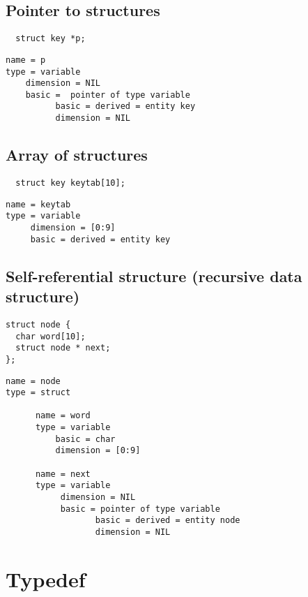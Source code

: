 \documentclass[a4paper]{report}
\begin{document}
\subsection{Pointer to structures}

\begin{lstlisting}
  struct key *p;
\end{lstlisting}

\begin{verbatim}
name = p
type = variable
    dimension = NIL
    basic =  pointer of type variable
          basic = derived = entity key
          dimension = NIL
\end{verbatim}

\subsection{Array of structures}

\begin{lstlisting}
  struct key keytab[10];
\end{lstlisting}

\begin{verbatim}
name = keytab
type = variable
     dimension = [0:9]
     basic = derived = entity key
\end{verbatim}

\subsection{Self-referential structure (recursive data structure)}

\begin{lstlisting}
struct node {
  char word[10];
  struct node * next;
};
\end{lstlisting}

\begin{verbatim}
name = node
type = struct 

      name = word
      type = variable
          basic = char
          dimension = [0:9] 

      name = next
      type = variable
           dimension = NIL
           basic = pointer of type variable
                  basic = derived = entity node
                  dimension = NIL
\end{verbatim}

\section{Typedef}
\end{document}
